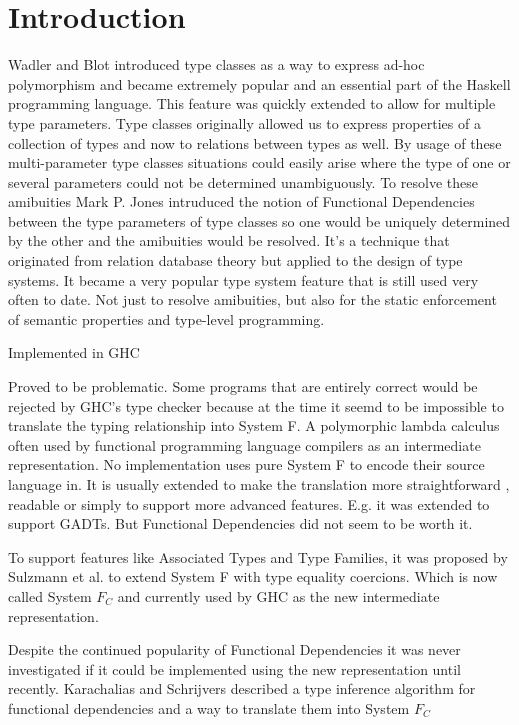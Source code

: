 \section{Introduction}
Wadler and Blot \cite{Wadler:1989:MAP:75277.75283} introduced type classes as a
way to express ad-hoc polymorphism and became extremely popular and an essential
part of the Haskell programming language. This feature was quickly extended to
allow for multiple type parameters. Type classes originally allowed us to
express properties of a collection of types and now to relations between types
as well. By usage of these multi-parameter type classes situations could easily
arise where the type of one or several parameters could not be determined
unambiguously. To resolve these amibuities Mark P. Jones intruduced the notion
of Functional Dependencies \cite{Jones00typeclasses} between the type parameters
of type classes so one would be uniquely determined by the other and the
amibuities would be resolved. It's a technique that originated from relation
database theory but applied to the design of type systems. It became a very
popular type system feature that is still used very often to date. Not just to
resolve amibuities, but also for the static enforcement of semantic properties
and type-level programming.

Implemented in GHC %

Proved to be problematic. Some programs that are entirely correct would be
rejected by GHC's type checker because at the time it seemd to be impossible to
translate the typing relationship into System F. A polymorphic lambda calculus
often used by functional programming language compilers as an intermediate
representation. No implementation uses pure System F to encode their source
language in. It is usually extended to make the translation more straightforward
, readable or simply to support more advanced features. E.g. it was extended to
support GADTs. But Functional Dependencies did not seem to be worth it.

To support features like Associated Types and Type Families, it was proposed by
Sulzmann et al. \cite{Sulzmann:2007:SFT:1190315.1190324} to extend System F with
type equality coercions. Which is now called System $F_C$ and currently used by
GHC as the new intermediate representation.

Despite the continued popularity of Functional Dependencies it was never
investigated if it could be implemented using the new representation until
recently. Karachalias and Schrijvers \cite{Karachalias:2017:EFD:3122955.3122966}
described a type inference algorithm for functional dependencies and a way to
translate them into System $F_C$
